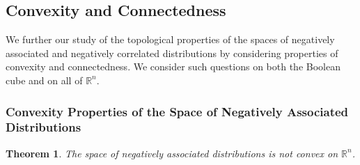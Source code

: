 \documentclass[11pt]{article}
\newcommand{\R}{\mathbb{R}}
\newcommand{\m}{\mathcal{M}}
\newtheorem{thm}{Theorem}
\begin{document}
\subsection{Convexity and Connectedness}
We further our study of the topological properties of the spaces of negatively associated and negatively correlated distributions by considering properties of convexity and connectedness. We consider such questions on both the Boolean cube and on all of $\R^n$.



\subsubsection{Convexity Properties of the Space of Negatively Associated Distributions}



\begin{thm}\label{convexNA}
The space of negatively associated
distributions is not convex on $\R^n$. 
\end{thm}
\end{document}
